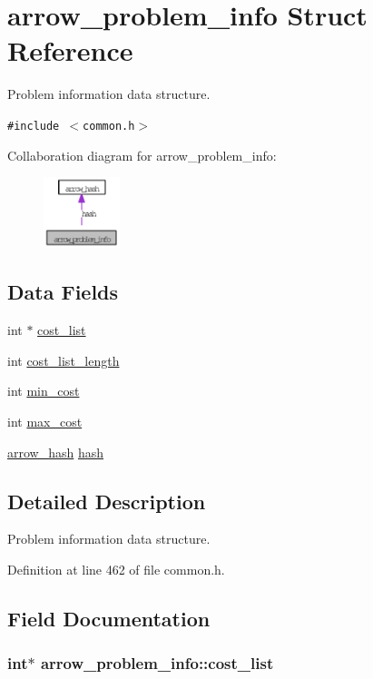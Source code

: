 \hypertarget{structarrow__problem__info}{
\section{arrow\_\-problem\_\-info Struct Reference}
\label{structarrow__problem__info}
}
Problem information data structure.  


{\tt \#include $<$common.h$>$}

Collaboration diagram for arrow\_\-problem\_\-info:\nopagebreak
\begin{figure}[H]
\begin{center}
\leavevmode
\includegraphics[width=63pt]{structarrow__problem__info__coll__graph}
\end{center}
\end{figure}
\subsection*{Data Fields}
\begin{CompactItemize}
\item 
int $\ast$ \hyperlink{structarrow__problem__info_7c9472312d7057fb9d74eb5579930216}{cost\_\-list}
\item 
int \hyperlink{structarrow__problem__info_54bbdc187af19361072480b45016f171}{cost\_\-list\_\-length}
\item 
int \hyperlink{structarrow__problem__info_46fabcc0ccd3a732cebb014331d4eeb5}{min\_\-cost}
\item 
int \hyperlink{structarrow__problem__info_724060f3be25521cca761899913c2776}{max\_\-cost}
\item 
\hyperlink{structarrow__hash}{arrow\_\-hash} \hyperlink{structarrow__problem__info_d62672139bdce70b23d8c72ecd96ff0d}{hash}
\end{CompactItemize}


\subsection{Detailed Description}
Problem information data structure. 

Definition at line 462 of file common.h.

\subsection{Field Documentation}
\hypertarget{structarrow__problem__info_7c9472312d7057fb9d74eb5579930216}{
\subsubsection{\setlength{\rightskip}{0pt plus 5cm}int$\ast$ {\bf arrow\_\-problem\_\-info::cost\_\-list}}}
\label{structarrow__problem__info_7c9472312d7057fb9d74eb5579930216}


